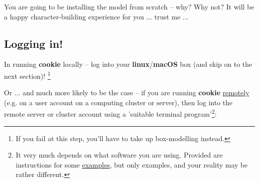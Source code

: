 You are going to be installing the model from scratch – why? Why not? It will be a happy character-building experience for you ... trust me ...


\subsection{Logging in!}

In running \textbf{cookie} locally -- log into your \textbf{linux}/\textbf{macOS} box (and skip on to the next section)! \footnote{If you fail at this step, you'll have to take up box-modelling instead.}

\noindent Or ... and much more likely to be the case -- if you are running \textbf{cookie} \uline{remotely} (e.g. on a user account on a computing cluster or server), then log into the remote server or cluster account using a 'suitable terminal program'\footnote{It very much depends on what software you are using. Provided are instructions for some \uline{examples}, but only examples, and your reality may be rather different.}:

